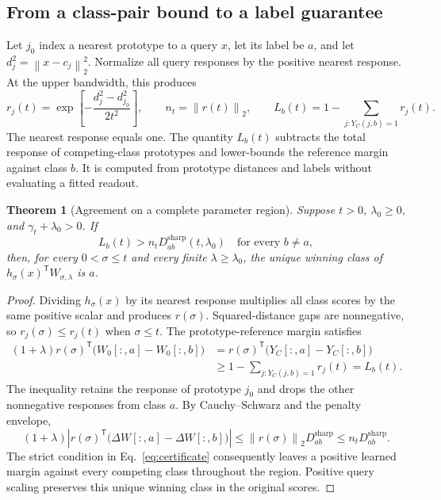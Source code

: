 \documentclass[preprint,12pt]{elsarticle}
\newtheorem{theorem}{Theorem}
\newcommand{\norm}[1]{\left\lVert#1\right\rVert}
\newcommand{\tr}{\mathsf{T}}
\newcommand{\sharpb}{\mathrm{sharp}}
\begin{document}
\subsection{From a class-pair bound to a label guarantee}
Let $j_0$ index a nearest prototype to a query $x$, let its label be $a$, and let $d_j^2=\norm{x-c_j}_2^2$. Normalize all query responses by the positive nearest response. At the upper bandwidth, this produces
\begin{equation}
 r_j(t)=\exp\left[-\frac{d_j^2-d_{j_0}^2}{2t^2}\right],\qquad
 n_t=\norm{r(t)}_2,\qquad
 L_b(t)=1-\sum_{j:Y_C(j,b)=1}r_j(t).
 \label{eq:query}
\end{equation}
The nearest response equals one. The quantity $L_b(t)$ subtracts the total response of competing-class prototypes and lower-bounds the reference margin against class $b$. It is computed from prototype distances and labels without evaluating a fitted readout.

\begin{theorem}[Agreement on a complete parameter region]
Suppose $t>0$, $\lambda_0\geq0$, and $\gamma_t+\lambda_0>0$. If
\begin{equation}
 L_b(t)>n_tD^{\sharpb}_{ab}(t,\lambda_0)
 \quad\text{for every }b\ne a,
 \label{eq:certificate}
\end{equation}
then, for every $0<\sigma\leq t$ and every finite $\lambda\geq\lambda_0$, the unique winning class of $h_\sigma(x)^\tr W_{\sigma,\lambda}$ is $a$.
\label{thm:agreement}
\end{theorem}
\begin{proof}
Dividing $h_\sigma(x)$ by its nearest response multiplies all class scores by the same positive scalar and produces $r(\sigma)$. Squared-distance gaps are nonnegative, so $r_j(\sigma)\leq r_j(t)$ when $\sigma\leq t$. The prototype-reference margin satisfies
\begin{align*}
 (1+\lambda)r(\sigma)^\tr\bigl(W_0[:,a]-W_0[:,b]\bigr)
 &=r(\sigma)^\tr\bigl(Y_C[:,a]-Y_C[:,b]\bigr)\\
 &\geq 1-\sum_{j:Y_C(j,b)=1}r_j(t)=L_b(t).
\end{align*}
The inequality retains the response of prototype $j_0$ and drops the other nonnegative responses from class $a$. By Cauchy--Schwarz and the penalty envelope,
\[
 (1+\lambda)\left|r(\sigma)^\tr
       \bigl(\Delta W[:,a]-\Delta W[:,b]\bigr)\right|
 \leq \norm{r(\sigma)}_2D^{\sharpb}_{ab}
 \leq n_tD^{\sharpb}_{ab}.
\]
The strict condition in Eq.~\eqref{eq:certificate} consequently leaves a positive learned margin against every competing class throughout the region. Positive query scaling preserves this unique winning class in the original scores.
\end{proof}
\end{document}
